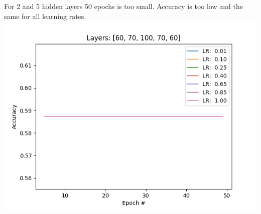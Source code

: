 \documentclass[12pt, letterpaper]{article}
\begin{document}
\begin{enumerate}[label=\Roman*.]
	   For 2 and 5 hidden layers 50 epochs is too small. Accuracy is too low and the same for all learning rates.
	   {\center \includegraphics[scale=0.7]{../images/accuracy_1.png} \\}
	           

\end{enumerate}
\end{document}
